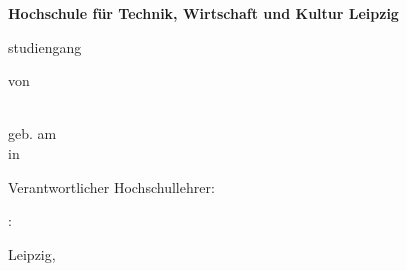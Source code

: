 \begin{titlepage}
{\centering
{\Large \textbf{Hochschule für Technik, Wirtschaft und Kultur Leipzig}\par}
{\large \textbf{\fak} \par}
{\large \abschluss studiengang \stdgang\par}
\vspace{1.75cm}
{\Large \textbf{\titel}\par}
\vspace{1.5cm}
{\large \art \par}
\vspace{3cm}
{\large  von\par}
\vspace{1.25cm}
{\autor\\[3ex]
geb. am \gebdatum\\[3ex]
in \gebort\\[3ex]
\mnr\par}}
\vfill
{\noindent Verantwortlicher Hochschullehrer: \betreuerI 
\par \vspace{0.25cm}
\betreuerIItaetigkeit: \betreuerII
\par \vspace{0.75cm}
Leipzig, \zeitraum} %
\end{titlepage}
